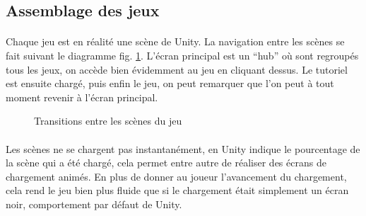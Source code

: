 \subsection{Assemblage des jeux}
\paragraph{}
Chaque jeu est en réalité une scène de Unity. La navigation entre les scènes se fait suivant le diagramme fig. \ref{transitions_scenes}. L'écran principal est un ``hub'' où sont regroupés tous les jeux, on accède bien évidemment au jeu en cliquant dessus. Le tutoriel est ensuite chargé, puis enfin le jeu, on peut remarquer que l'on peut à tout moment revenir à l'écran principal.

\begin{figure}[H]\centering
  \caption{Transitions entre les scènes du jeu}
  \label{transitions_scenes}
\end{figure}

\paragraph{}
Les scènes ne se chargent pas instantanément, en Unity indique le pourcentage de la scène qui a été chargé, cela permet entre autre de réaliser des écrans de chargement animés. En plus de donner au joueur l'avancement du chargement, cela rend le jeu bien plus fluide que si le chargement était simplement un écran noir, comportement par défaut de Unity.

